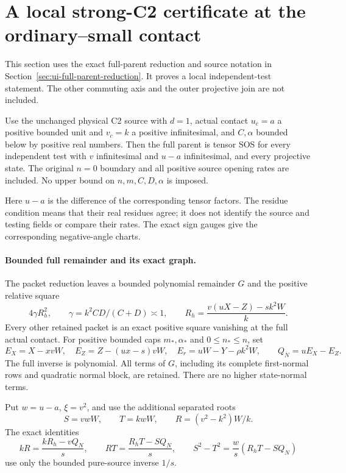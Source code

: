 \section[A local strong-C2 certificate at the ordinary--small contact]{A local strong-C2 certificate at the ordinary--small contact}
\label{sec:local-ui-certificate}

This section uses the exact full-parent reduction and source notation
in Section~\ref{sec:ui-full-parent-reduction}. It proves a local independent-test
statement. The other commuting axis and the outer projective join
are not included.

\begin{theorem}
Use the unchanged physical C2 source with $d=1$, actual contact
$u_c=a$ a positive bounded unit and $v_c=k$ a positive infinitesimal,
and $C,\alpha$ bounded below by positive real numbers. Then the full
parent is tensor SOS for every independent test with $v$ infinitesimal
and $u-a$ infinitesimal, and every projective state. The original
$n=0$ boundary and all positive source opening rates are included.
No upper bound on $n,m,C,D,\alpha$ is imposed.
\end{theorem}

Here $u-a$ is the difference of the corresponding tensor factors.
The residue condition means that their real residues agree; it does
not identify the source and testing fields or compare their rates.
The exact sign gauges give the corresponding negative-angle charts.

\paragraph{Bounded full remainder and its exact graph.}
The packet reduction leaves a bounded polynomial remainder $G$ and
the positive relative square
\[
 4\gamma R_h^2,\qquad
 \gamma=k^2CD/(C+D)\asymp1,\qquad
 R_h=\frac{v(uX-Z)-s k^2W}{k}.
\]
Every other retained packet is an exact positive square vanishing
at the full actual contact. For positive bounded caps $m_*,\alpha_*$
and $0\le n_*\le n$, set
\[
 E_X=X-xvW,\quad E_Z=Z-(ux-s)vW,\quad
 E_r=uW-Y-\rho k^2W,
 \qquad Q_N=uE_X-E_Z.
\]
The full inverse is polynomial. All terms of $G$, including its
complete first-normal rows and quadratic normal block, are retained.
There are no higher state-normal terms.

Put $w=u-a$, $\xi=v^2$, and use the additional separated roots
\[
 S=vwW,\qquad T=kwW,\qquad R=(v^2-k^2)W/k.
\]
The exact identities
\[
 kR=\frac{kR_h-vQ_N}{s},\qquad
 RT=\frac{R_hT-SQ_N}{s},\qquad
 S^2-T^2=\frac w s(R_hT-SQ_N)                      \tag{UI1}
\]
use only the bounded pure-source inverse $1/s$.

